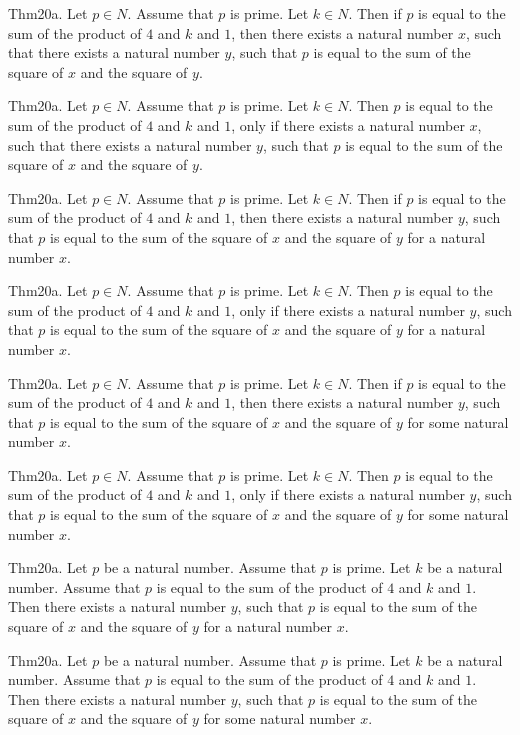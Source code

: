 \documentclass{article}
\begin{document}
Thm20a. Let $p \in N$. Assume that $p$ is prime. Let $k \in N$. Then if $p$ is equal to the sum of the product of $4$ and $k$ and $1$, then there exists a natural number $x$, such that there exists a natural number $y$, such that $p$ is equal to the sum of the square of $x$ and the square of $y$.

Thm20a. Let $p \in N$. Assume that $p$ is prime. Let $k \in N$. Then $p$ is equal to the sum of the product of $4$ and $k$ and $1$, only if there exists a natural number $x$, such that there exists a natural number $y$, such that $p$ is equal to the sum of the square of $x$ and the square of $y$.

Thm20a. Let $p \in N$. Assume that $p$ is prime. Let $k \in N$. Then if $p$ is equal to the sum of the product of $4$ and $k$ and $1$, then there exists a natural number $y$, such that $p$ is equal to the sum of the square of $x$ and the square of $y$ for a natural number $x$.

Thm20a. Let $p \in N$. Assume that $p$ is prime. Let $k \in N$. Then $p$ is equal to the sum of the product of $4$ and $k$ and $1$, only if there exists a natural number $y$, such that $p$ is equal to the sum of the square of $x$ and the square of $y$ for a natural number $x$.

Thm20a. Let $p \in N$. Assume that $p$ is prime. Let $k \in N$. Then if $p$ is equal to the sum of the product of $4$ and $k$ and $1$, then there exists a natural number $y$, such that $p$ is equal to the sum of the square of $x$ and the square of $y$ for some natural number $x$.

Thm20a. Let $p \in N$. Assume that $p$ is prime. Let $k \in N$. Then $p$ is equal to the sum of the product of $4$ and $k$ and $1$, only if there exists a natural number $y$, such that $p$ is equal to the sum of the square of $x$ and the square of $y$ for some natural number $x$.

Thm20a. Let $p$ be a natural number. Assume that $p$ is prime. Let $k$ be a natural number. Assume that $p$ is equal to the sum of the product of $4$ and $k$ and $1$. Then there exists a natural number $y$, such that $p$ is equal to the sum of the square of $x$ and the square of $y$ for a natural number $x$.

Thm20a. Let $p$ be a natural number. Assume that $p$ is prime. Let $k$ be a natural number. Assume that $p$ is equal to the sum of the product of $4$ and $k$ and $1$. Then there exists a natural number $y$, such that $p$ is equal to the sum of the square of $x$ and the square of $y$ for some natural number $x$.
\end{document}
